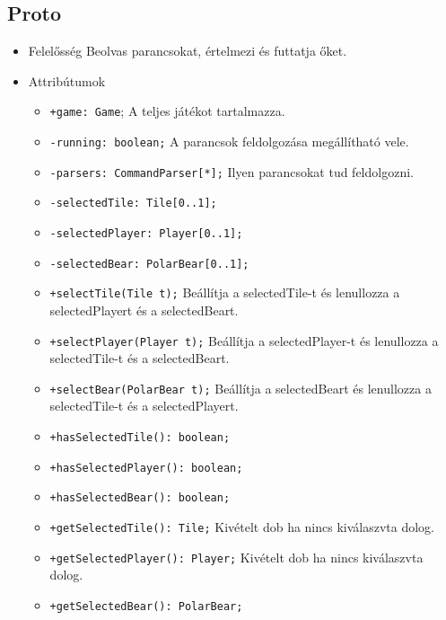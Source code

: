 \subsection{Proto}
\begin{itemize}
\item Felelősség\newline
Beolvas parancsokat, értelmezi és futtatja őket.
\item Attribútumok
	\begin{itemize}
		\item \texttt{+game: Game}; \newline
		A teljes játékot tartalmazza.
		\item \texttt{-running: boolean;} \newline
		A parancsok feldolgozása megállítható vele.
		\item \texttt{-parsers: CommandParser[*];} \newline
		Ilyen parancsokat tud feldolgozni.
		\item \texttt{-selectedTile: Tile[0..1];}
		\item \texttt{-selectedPlayer: Player[0..1];}
		\item \texttt{-selectedBear: PolarBear[0..1];}
		\item \texttt{+selectTile(Tile t);} \newline			
		Beállítja a selectedTile-t és lenullozza a selectedPlayert és a selectedBeart.			
		\item \texttt{+selectPlayer(Player t);} \newline
		Beállítja a selectedPlayer-t és lenullozza a selectedTile-t és a selectedBeart.	
		\item \texttt{+selectBear(PolarBear t);} \newline			
		Beállítja a selectedBeart és lenullozza a selectedTile-t és a selectedPlayert.			
		\item \texttt{+hasSelectedTile(): boolean;}
		\item \texttt{+hasSelectedPlayer(): boolean;}
		\item \texttt{+hasSelectedBear(): boolean;}
		\item \texttt{+getSelectedTile(): Tile;}
		Kivételt dob ha nincs kiválaszvta dolog.			
		\item \texttt{+getSelectedPlayer(): Player;} \newline
		Kivételt dob ha nincs kiválaszvta dolog.
		\item \texttt{+getSelectedBear(): PolarBear;} \newline

\end{itemize}
\end{itemize}

